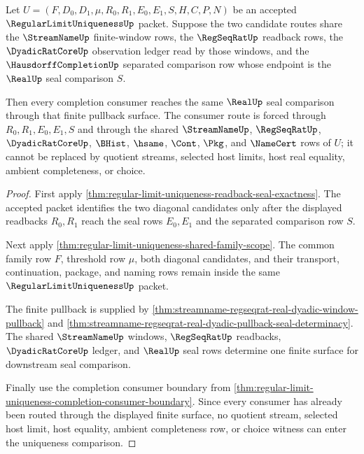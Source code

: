 \begin{theorem}
\label{thm:regular-limit-uniqueness-dyadic-window-separation-pullback}
Let $U=(F,D_0,D_1,\mu,R_0,R_1,E_0,E_1,S,H,C,P,N)$ be an accepted $\RegularLimitUniquenessUp$ packet. Suppose the two candidate routes share the $\StreamNameUp$ finite-window rows, the $\RegSeqRatUp$ readback rows, the $\DyadicRatCoreUp$ observation ledger read by those windows, and the $\HausdorffCompletionUp$ separated comparison row whose endpoint is the $\RealUp$ seal comparison $S$.

Then every completion consumer reaches the same $\RealUp$ seal comparison through that finite pullback surface. The consumer route is forced through $R_0,R_1,E_0,E_1,S$ and through the shared $\StreamNameUp$, $\RegSeqRatUp$, $\DyadicRatCoreUp$, $\BHist$, $\hsame$, $\Cont$, $\Pkg$, and $\NameCert$ rows of $U$; it cannot be replaced by quotient streams, selected host limits, host real equality, ambient completeness, or choice.
\end{theorem}
\begin{proof}
First apply \autoref{thm:regular-limit-uniqueness-readback-seal-exactness}. The accepted packet identifies the two diagonal candidates only after the displayed readbacks $R_0,R_1$ reach the seal rows $E_0,E_1$ and the separated comparison row $S$.

Next apply \autoref{thm:regular-limit-uniqueness-shared-family-scope}. The common family row $F$, threshold row $\mu$, both diagonal candidates, and their transport, continuation, package, and naming rows remain inside the same $\RegularLimitUniquenessUp$ packet.

The finite pullback is supplied by \autoref{thm:streamname-regseqrat-real-dyadic-window-pullback} and \autoref{thm:streamname-regseqrat-real-dyadic-pullback-seal-determinacy}. The shared $\StreamNameUp$ windows, $\RegSeqRatUp$ readbacks, $\DyadicRatCoreUp$ ledger, and $\RealUp$ seal rows determine one finite surface for downstream seal comparison.

Finally use the completion consumer boundary from \autoref{thm:regular-limit-uniqueness-completion-consumer-boundary}. Since every consumer has already been routed through the displayed finite surface, no quotient stream, selected host limit, host equality, ambient completeness row, or choice witness can enter the uniqueness comparison.
\end{proof}

